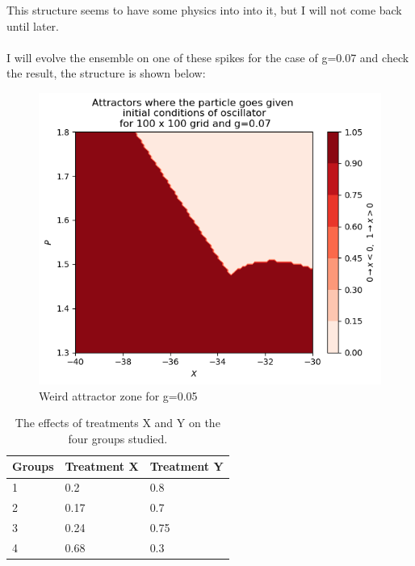 \documentclass[idxtotoc,hyperref,openany]{labbook} %
\begin{document}
This structure seems to have some physics into into it, but I will not come back until later.
\\
\\
I will evolve the ensemble on one of these spikes for the case of g=0.07 and check the result, the structure is shown below:
\begin{figure}[H] %
\begin{center}
\includegraphics[width=1\linewidth]{zonararag0-07CalvoSanz.png}
\end{center}
\caption{Weird attractor zone for g=0.05}
\label{WeirdAttractorg0-05}
\end{figure}





\lipsum[3-5]




\begin{table}[H]
\begin{tabular}{l l l}
\toprule
\textbf{Groups} & \textbf{Treatment X} & \textbf{Treatment Y} \\
\toprule
1 & 0.2 & 0.8\\
2 & 0.17 & 0.7\\
3 & 0.24 & 0.75\\
4 & 0.68 & 0.3\\
\bottomrule
\end{tabular}
\caption{The effects of treatments X and Y on the four groups studied.}
\label{tab:treatments_xy}
\end{table}
\end{document}
